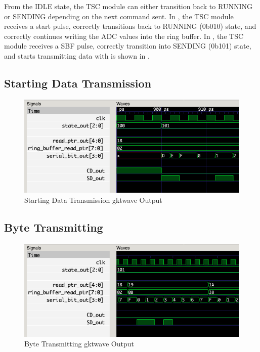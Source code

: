 From the IDLE state, the TSC module can either transition back to RUNNING or SENDING depending on the next command sent.
In , the TSC module receives a start pulse, correctly transitions back to RUNNING (0b010) state, and correctly continues writing the ADC values into the ring buffer.
In , the TSC module receives a SBF pulse, correctly transition into SENDING (0b101) state, and starts transmitting data with is shown in .

\subsection{Starting Data Transmission}\label{subsec:starting-data-transmission}
\begin{figure}[H]
    \centering
    \includegraphics[width=\columnwidth]{Figures/Htransmit_start}
    \caption{Starting Data Transmission gktwave Output}
    \label{fig:testH}
\end{figure}

\subsection{Byte Transmitting}
\begin{figure}[H]
    \centering
    \includegraphics[width=\columnwidth]{Figures/Ibyte_transmit}
    \caption{Byte Transmitting gktwave Output}
    \label{fig:testI}
\end{figure}

